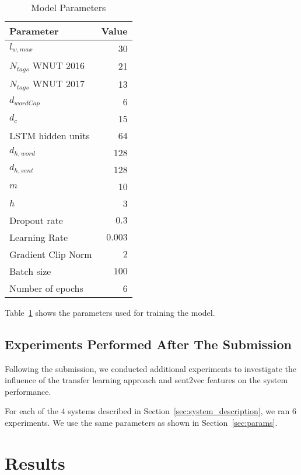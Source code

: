 \documentclass[11pt,letterpaper]{article}
\begin{document}
\begin{table}
\centering
    \begin{tabular}{l r}
        Parameter & Value \\
        \hline
        $l_{w, max}$ & 30 \\
        $N_{tags}$ WNUT 2016 & 21 \\
        $N_{tags}$ WNUT 2017 & 13 \\
        $d_{wordCap}$ & 6 \\
        $d_{c}$ & 15 \\
        LSTM hidden units & 64 \\
        $d_{h, word}$ & 128 \\
        $d_{h, sent}$ & 128 \\
        $m$ & 10 \\
        $h$ & 3 \\
        Dropout rate & $0.3$ \\
        Learning Rate & $0.003$ \\
        Gradient Clip Norm & $2$ \\
        Batch size & $100$ \\
        Number of epochs & 6 \\
        \hline
    \end{tabular}
    \caption{Model Parameters}\label{tab:params}
\end{table}

Table~\ref{tab:params} shows the parameters used for training the model.

\subsection{Experiments Performed After The Submission}
\label{sec:follow_up_experiments}

Following the submission, we conducted additional experiments to investigate
the influence of the transfer learning approach and sent2vec features on the
system performance.

For each of the $4$ systems described in Section~\ref{sec:system_description},
we ran $6$ experiments. We use the same parameters as shown in Section~\ref{sec:params}.

\section{Results}
\end{document}
